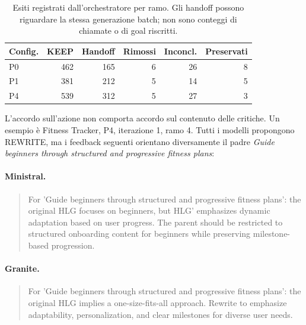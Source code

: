 \begin{table}[H]
\centering\small
\caption{Esiti registrati dall'orchestratore per ramo. Gli handoff possono riguardare la stessa generazione batch; non sono conteggi di chiamate o di goal riscritti.}\label{tab:applied-dynamics}
\begin{tabular}{lrrrrr}
\toprule
Config. & KEEP & Handoff & Rimossi & Inconcl. & Preservati \\
\midrule
P0 & 462 & 165 & 6 & 26 & 8 \\
P1 & 381 & 212 & 5 & 14 & 5 \\
P4 & 539 & 312 & 5 & 27 & 3 \\
\bottomrule
\end{tabular}
\end{table}
L'accordo sull'azione non comporta accordo sul contenuto delle critiche.
Un esempio \`e Fitness Tracker, P4, iterazione 1, ramo 4. Tutti i modelli
propongono REWRITE, ma i feedback seguenti orientano diversamente il padre
\emph{Guide beginners through structured and progressive fitness plans}:
\paragraph{Ministral.}
\begin{quote}\small
For 'Guide beginners through structured and progressive fitness plans': the original HLG focuses on beginners, but HLG' emphasizes dynamic adaptation based on user progress. The parent should be restricted to structured onboarding content for beginners while preserving milestone-based progression.
\end{quote}
\paragraph{Granite.}
\begin{quote}\small
For 'Guide beginners through structured and progressive fitness plans': the original HLG implies a one-size-fits-all approach. Rewrite to emphasize adaptability, personalization, and clear milestones for diverse user needs.
\end{quote}
